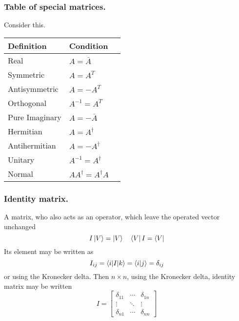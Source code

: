 \documentclass[../main.tex]{subfiles}
\begin{document}
\subsubsection*{Table of special matrices.} Consider this.

\begin{table}[h]
	\centering
	\begin{tabular}{@{}llr@{}}
		\toprule
		Definition     & Condition                   \\
		\midrule
		Real           & $A=\bar{A}$                 \\
		Symmetric      & $A=A^T$                     \\
		Antisymmetric  & $A=-A^T$                    \\
		Orthogonal     & $A^{-1}=A^T$                \\
		Pure Imaginary & $A=-\bar{A}$                \\
		Hermitian      & $A=A^{\dagger}$             \\
		Antihermitian  & $A=-A^{\dagger}$            \\
		Unitary        & $A^{-1}=A^{\dagger}$        \\
		Normal         & $AA^{\dagger}=A^{\dagger}A$ \\
		\bottomrule
	\end{tabular}
\end{table}

\subsubsection*{Identity matrix.}
A matrix, who also acts as an operator, which leave the operated vector unchanged
\begin{equation*}
	I \ket{V}=\ket{V}\quad \bra{V}I=\bra{V}
\end{equation*}
Its element may be written as
\begin{equation*}
	I_{ij} =\braket{i|I|k}=\braket{i|j}=\delta_{ij}
\end{equation*}
or using the Kronecker delta.
Then $n\times n$, using the Kronecker delta, identity matrix may be written
\begin{equation*}
	I = \begin{bmatrix}
		\delta_{11} & \cdots & \delta_{1n} \\
		\vdots      & \ddots & \vdots      \\
		\delta_{n1} & \cdots & \delta_{nn}
	\end{bmatrix}
\end{equation*}
\end{document}
